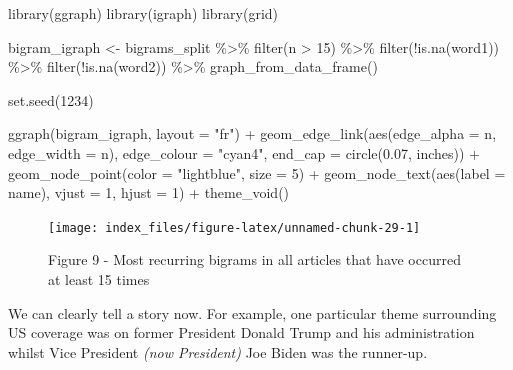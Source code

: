 \documentclass[
]{article}
\newenvironment{Shaded}{\begin{snugshade}}{\end{snugshade}}
\newcommand{\AttributeTok}[1]{\textcolor[rgb]{0.77,0.63,0.00}{#1}}
\newcommand{\DecValTok}[1]{\textcolor[rgb]{0.00,0.00,0.81}{#1}}
\newcommand{\FloatTok}[1]{\textcolor[rgb]{0.00,0.00,0.81}{#1}}
\newcommand{\FunctionTok}[1]{\textcolor[rgb]{0.00,0.00,0.00}{#1}}
\newcommand{\NormalTok}[1]{#1}
\newcommand{\OtherTok}[1]{\textcolor[rgb]{0.56,0.35,0.01}{#1}}
\newcommand{\SpecialCharTok}[1]{\textcolor[rgb]{0.00,0.00,0.00}{#1}}
\newcommand{\StringTok}[1]{\textcolor[rgb]{0.31,0.60,0.02}{#1}}
\begin{document}
\begin{Shaded}
\begin{Highlighting}[]
\FunctionTok{library}\NormalTok{(ggraph)}
\FunctionTok{library}\NormalTok{(igraph)}
\FunctionTok{library}\NormalTok{(grid)}

\NormalTok{bigram\_igraph }\OtherTok{\textless{}{-}}\NormalTok{ bigrams\_split }\SpecialCharTok{\%\textgreater{}\%}
 \FunctionTok{filter}\NormalTok{(n }\SpecialCharTok{\textgreater{}} \DecValTok{15}\NormalTok{) }\SpecialCharTok{\%\textgreater{}\%}
 \FunctionTok{filter}\NormalTok{(}\SpecialCharTok{!}\FunctionTok{is.na}\NormalTok{(word1)) }\SpecialCharTok{\%\textgreater{}\%}
 \FunctionTok{filter}\NormalTok{(}\SpecialCharTok{!}\FunctionTok{is.na}\NormalTok{(word2)) }\SpecialCharTok{\%\textgreater{}\%}
 \FunctionTok{graph\_from\_data\_frame}\NormalTok{() }

\FunctionTok{set.seed}\NormalTok{(}\DecValTok{1234}\NormalTok{)}

\FunctionTok{ggraph}\NormalTok{(bigram\_igraph, }\AttributeTok{layout =} \StringTok{"fr"}\NormalTok{) }\SpecialCharTok{+} 
\FunctionTok{geom\_edge\_link}\NormalTok{(}\FunctionTok{aes}\NormalTok{(}\AttributeTok{edge\_alpha =}\NormalTok{ n, }\AttributeTok{edge\_width =}\NormalTok{ n), }\AttributeTok{edge\_colour =} \StringTok{"cyan4"}\NormalTok{, }\AttributeTok{end\_cap =} \FunctionTok{circle}\NormalTok{(}\FloatTok{0.07}\NormalTok{, }\StringTok{\textquotesingle{}inches\textquotesingle{}}\NormalTok{)) }\SpecialCharTok{+}
\FunctionTok{geom\_node\_point}\NormalTok{(}\AttributeTok{color =} \StringTok{"lightblue"}\NormalTok{, }\AttributeTok{size =} \DecValTok{5}\NormalTok{) }\SpecialCharTok{+} 
\FunctionTok{geom\_node\_text}\NormalTok{(}\FunctionTok{aes}\NormalTok{(}\AttributeTok{label =}\NormalTok{ name), }\AttributeTok{vjust =} \DecValTok{1}\NormalTok{, }\AttributeTok{hjust =} \DecValTok{1}\NormalTok{) }\SpecialCharTok{+} 
\FunctionTok{theme\_void}\NormalTok{()}
\end{Highlighting}
\end{Shaded}

\begin{figure}

{\centering \texttt{[image: index\_files/figure-latex/unnamed-chunk-29-1]} 

}

\caption{Figure 9 - Most recurring bigrams in all articles that have occurred at least 15 times}\label{fig:unnamed-chunk-29}
\end{figure}

We can clearly tell a story now. For example, one particular theme
surrounding US coverage was on former President Donald Trump and his
administration whilst Vice President \emph{(now President)} Joe Biden
was the runner-up.
\end{document}
